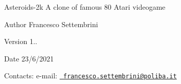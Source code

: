 \begin{DoxyParagraph}{Asteroids-\/2k}
A clone of famous \textquotesingle{}80 Atari videogame 
\end{DoxyParagraph}
\begin{DoxyAuthor}{Author}
Francesco Settembrini 
\end{DoxyAuthor}
\begin{DoxyVersion}{Version}
1.. 
\end{DoxyVersion}
\begin{DoxyDate}{Date}
23/6/2021
\end{DoxyDate}
\begin{DoxyParagraph}{Contacts\+:}
e-\/mail\+: \href{mailto:francesco.settembrini@poliba.it}{\texttt{ francesco.\+settembrini@poliba.\+it}} 
\end{DoxyParagraph}

